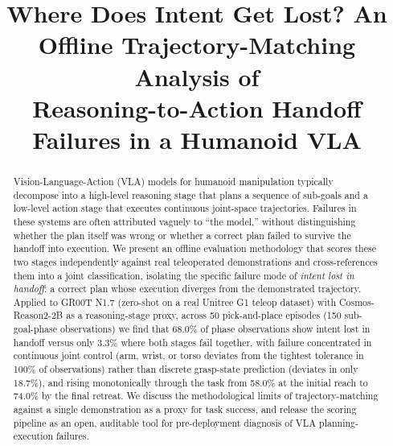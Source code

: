 \documentclass[conference]{IEEEtran}
\begin{document}
\title{Where Does Intent Get Lost? An Offline Trajectory-Matching Analysis of\\
Reasoning-to-Action Handoff Failures in a Humanoid VLA}

\author{
}

\maketitle

\begin{abstract}
Vision-Language-Action (VLA) models for humanoid manipulation typically decompose into a
high-level reasoning stage that plans a sequence of sub-goals and a low-level action stage
that executes continuous joint-space trajectories. Failures in these systems are often
attributed vaguely to ``the model,'' without distinguishing whether the plan itself was
wrong or whether a correct plan failed to survive the handoff into execution. We present
an offline evaluation methodology that scores these two stages independently against real
teleoperated demonstrations and cross-references them into a joint classification,
isolating the specific failure mode of \emph{intent lost in handoff}: a correct plan whose
execution diverges from the demonstrated trajectory. Applied to GR00T N1.7 (zero-shot on a
real Unitree G1 teleop dataset) with Cosmos-Reason2-2B as a reasoning-stage proxy, across
50 pick-and-place episodes (150 sub-goal-phase observations) we find that 68.0\% of phase
observations show intent lost in handoff versus only 3.3\% where both stages fail
together, with failure concentrated in continuous joint control (arm, wrist, or torso
deviates from the tightest tolerance in 100\% of observations) rather than discrete
grasp-state prediction (deviates in only 18.7\%), and rising monotonically through the
task from 58.0\% at the initial reach to 74.0\% by the final retreat. We discuss the
methodological limits of trajectory-matching against a single demonstration as a proxy
for task success, and release the scoring pipeline as an open, auditable tool for
pre-deployment diagnosis of VLA planning-execution failures.
\end{abstract}
\end{document}
